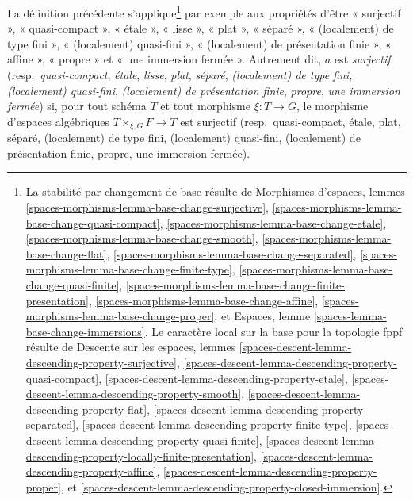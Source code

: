 \medskip\noindent
La définition précédente s'applique\footnote{La stabilité par changement
de base résulte de
Morphismes d'espaces, lemmes
\ref{spaces-morphisms-lemma-base-change-surjective},
\ref{spaces-morphisms-lemma-base-change-quasi-compact},
\ref{spaces-morphisms-lemma-base-change-etale},
\ref{spaces-morphisms-lemma-base-change-smooth},
\ref{spaces-morphisms-lemma-base-change-flat},
\ref{spaces-morphisms-lemma-base-change-separated},
\ref{spaces-morphisms-lemma-base-change-finite-type},
\ref{spaces-morphisms-lemma-base-change-quasi-finite},
\ref{spaces-morphisms-lemma-base-change-finite-presentation},
\ref{spaces-morphisms-lemma-base-change-affine},
\ref{spaces-morphisms-lemma-base-change-proper}, et
Espaces, lemme
\ref{spaces-lemma-base-change-immersions}.
Le caractère local sur la base pour la topologie fppf résulte de
Descente sur les espaces, lemmes
\ref{spaces-descent-lemma-descending-property-surjective},
\ref{spaces-descent-lemma-descending-property-quasi-compact},
\ref{spaces-descent-lemma-descending-property-etale},
\ref{spaces-descent-lemma-descending-property-smooth},
\ref{spaces-descent-lemma-descending-property-flat},
\ref{spaces-descent-lemma-descending-property-separated},
\ref{spaces-descent-lemma-descending-property-finite-type},
\ref{spaces-descent-lemma-descending-property-quasi-finite},
\ref{spaces-descent-lemma-descending-property-locally-finite-presentation},
\ref{spaces-descent-lemma-descending-property-affine},
\ref{spaces-descent-lemma-descending-property-proper}, et
\ref{spaces-descent-lemma-descending-property-closed-immersion}.
}
par exemple aux propriétés d'être
« surjectif »,
« quasi-compact »,
« étale »,
« lisse »,
« plat »,
« séparé »,
« (localement) de type fini »,
« (localement) quasi-fini »,
« (localement) de présentation finie »,
« affine »,
« propre » et
« une immersion fermée ».
Autrement dit, $a$ est
{\it surjectif}
(resp.\ {\it quasi-compact},
{\it étale},
{\it lisse},
{\it plat},
{\it séparé},
{\it (localement) de type fini},
{\it (localement) quasi-fini},
{\it (localement) de présentation finie},
{\it propre},
{\it une immersion fermée})
si, pour tout schéma $T$ et tout morphisme $\xi : T \to G$,
le morphisme d'espaces algébriques $T \times_{\xi, G} F \to T$ est
surjectif
(resp.\ quasi-compact,
étale,
plat,
séparé,
(localement) de type fini,
(localement) quasi-fini,
(localement) de présentation finie,
propre,
une immersion fermée).


